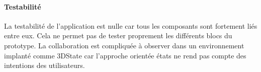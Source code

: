 			\paragraph{Testabilité}
La testabilité de l'application est nulle car tous les composants sont fortement liés 
entre eux. Cela ne permet pas de tester proprement les différents blocs du 
prototype. La collaboration est compliquée à observer dans un environnement 
implanté comme 3DState car l'approche orientée états ne rend pas compte des 
intentions des utilisateurs.